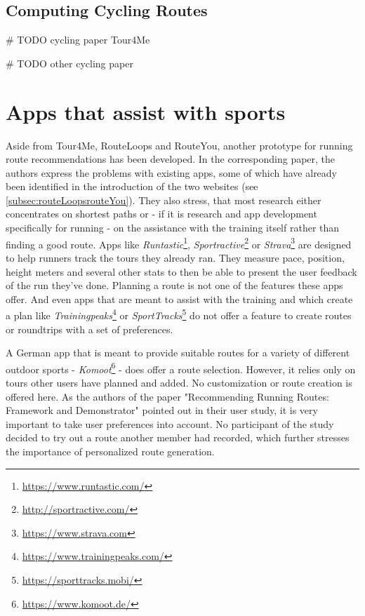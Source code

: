 \subsection{Computing Cycling Routes}
\label{subsec:cyclingRoutes}
\# TODO cycling paper Tour4Me

\# TODO other cycling paper





\section{Apps that assist with sports}
\label{sec:runningApps}

Aside from Tour4Me, RouteLoops and RouteYou, another prototype for running route recommendations has been developed.
In the corresponding paper\cite{loepp_recommending_nodate}, the authors express the problems with existing apps, some of which have already been identified in the introduction of the two websites (see \ref{subsec:routeLoopsrouteYou}).
They also stress, that most research either concentrates on shortest paths or - if it is research and app development specifically for running - on the assistance with the training itself rather than finding a good route.
Apps like \textit{Runtastic}\footnote{\url{https://www.runtastic.com/}}, \textit{Sportractive}\footnote{\url{http://sportractive.com/}} or \textit{Strava}\footnote{\url{https://www.strava.com}} are designed to help runners track the tours they already ran. 
They measure pace, position, height meters and several other stats to then be able to present the user feedback of the run they've done. 
Planning a route is not one of the features these apps offer.
And even apps that are meant to assist with the training and which create a plan like \textit{Trainingpeaks}\footnote{\url{https://www.trainingpeaks.com/}} or \textit{SportTracks}\footnote{\url{https://sporttracks.mobi/}} do not offer a feature to create routes or roundtrips with a set of preferences\cite{loepp_recommending_nodate}.

A German app that is meant to provide suitable routes for a variety of different outdoor sports - \textit{Komoot}\footnote{\url{https://www.komoot.de/}} - does offer a route selection. 
However, it relies only on tours other users have planned and added. No customization or route creation is offered here. 
As the authors of the paper "Recommending Running Routes: Framework and Demonstrator"\cite{loepp_recommending_nodate} pointed out in their user study, it is very important to take user preferences into account. 
No participant of the study decided to try out a route another member had recorded, which further stresses the importance of personalized route generation\cite{loepp_recommending_nodate}.

